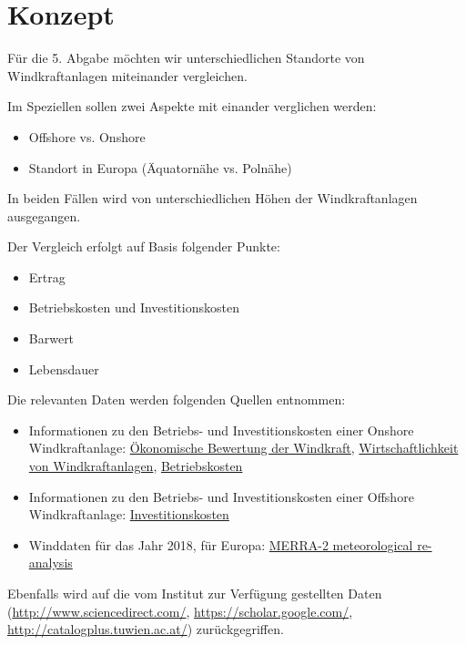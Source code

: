 \documentclass[a4paper,12pt]{article}
\begin{document}
	

	\newpage
	\tableofcontents

	\newpage
	
	\section{Konzept}
	Für die 5. Abgabe möchten wir unterschiedlichen Standorte von Windkraftanlagen miteinander vergleichen.\\ \par
	\noindent Im Speziellen sollen zwei Aspekte mit einander verglichen werden:
	\begin{itemize}
		\item Offshore vs. Onshore
		\item Standort in Europa (Äquatornähe vs. Polnähe)
	\end{itemize}
	In beiden Fällen wird von unterschiedlichen Höhen der Windkraftanlagen ausgegangen.\\ \par
	\noindent Der Vergleich erfolgt auf Basis folgender Punkte:
	\begin{itemize}
		\item Ertrag
		\item Betriebskosten und Investitionskosten
		\item Barwert
		\item Lebensdauer
	\end{itemize}
	Die relevanten Daten werden folgenden Quellen entnommen:
	\begin{itemize}
		\item Informationen zu den Betriebs- und Investitionskosten einer Onshore Windkraftanlage: \href{https://www.diplomarbeitsboerse.info/wp-content/uploads/%C3%96konomische-Bewertung-der-Windkraft_Bsp-Gro%C3%9Fhofen.pdf}{Ökonomische Bewertung der Windkraft}, 
		\href{https://elite.tugraz.at/Jungbauer/6.htm}{Wirtschaftlichkeit von Windkraftanlagen},  \href{http://windmonitor.iee.fraunhofer.de/windmonitor_de/3_Onshore/5_betriebsergebnisse/4_betriebskosten/}{Betriebskosten}
		\item Informationen zu den Betriebs- und Investitionskosten einer Offshore Windkraftanlage:
		\href{http://windmonitor.iee.fraunhofer.de/windmonitor_de/4_Offshore/5_betriebsergebnisse/4_Investitionskosten/}{Investitionskosten}
		\item Winddaten für das Jahr 2018, für Europa:
		\href{http://www.soda-pro.com/web-services/meteo-data/merra}{MERRA-2 meteorological re-analysis}
	\end{itemize}
	Ebenfalls wird auf die vom Institut zur Verfügung gestellten Daten (\href{http://www.sciencedirect.com/}{http://www.sciencedirect.com/}, \href{https://scholar.google.com/}{https://scholar.google.com/}, \href{http://catalogplus.tuwien.ac.at/}{http://catalogplus.tuwien.ac.at/}) zurückgegriffen.
	
	\newpage
	\listoffigures
	
\end{document}
